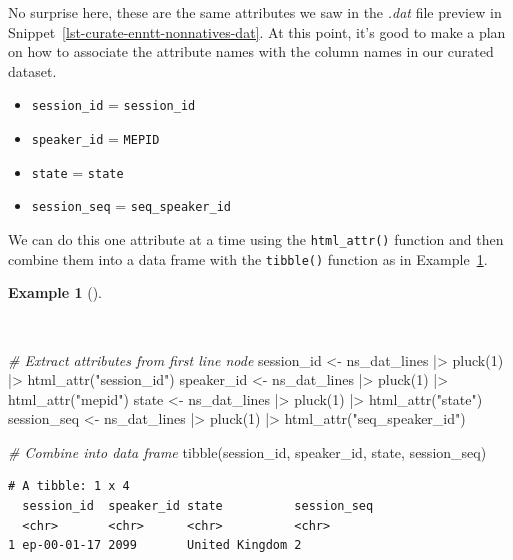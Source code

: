 \documentclass[
  letterpaper,
]{book}
\newenvironment{Shaded}{\begin{snugshade}}{\end{snugshade}}
\newcommand{\CommentTok}[1]{\textcolor[rgb]{0.00,0.00,0.00}{\textit{#1}}}
\newcommand{\DecValTok}[1]{\textcolor[rgb]{0.00,0.00,0.00}{#1}}
\newcommand{\FunctionTok}[1]{\textcolor[rgb]{0.00,0.00,0.00}{#1}}
\newcommand{\NormalTok}[1]{\textcolor[rgb]{0.00,0.00,0.00}{#1}}
\newcommand{\OtherTok}[1]{\textcolor[rgb]{0.00,0.00,0.00}{#1}}
\newcommand{\SpecialCharTok}[1]{\textcolor[rgb]{0.00,0.00,0.00}{#1}}
\newcommand{\StringTok}[1]{\textcolor[rgb]{0.00,0.00,0.00}{#1}}
\providecommand{\tightlist}{%
  \setlength{\itemsep}{0pt}\setlength{\parskip}{0pt}}\usepackage{longtable,booktabs,array}
\theoremstyle{definition}
\newtheorem{example}{Example}[chapter]
\theoremstyle{remark}
\begin{document}
No surprise here, these are the same attributes we saw in the
\emph{.dat} file preview in
Snippet~\ref{lst-curate-enntt-nonnatives-dat}. At this point, it's good
to make a plan on how to associate the attribute names with the column
names in our curated dataset.

\begin{itemize}
\tightlist
\item
  \texttt{session\_id} = \texttt{session\_id}
\item
  \texttt{speaker\_id} = \texttt{MEPID}
\item
  \texttt{state} = \texttt{state}
\item
  \texttt{session\_seq} = \texttt{seq\_speaker\_id}
\end{itemize}

We can do this one attribute at a time using the \texttt{html\_attr()}
function and then combine them into a data frame with the
\texttt{tibble()} function as in
Example~\ref{exm-curate-enntt-extract-attributes}.

\begin{example}[]\protect\hypertarget{exm-curate-enntt-extract-attributes}{}\label{exm-curate-enntt-extract-attributes}

~

\begin{Shaded}
\begin{Highlighting}[]
\CommentTok{\# Extract attributes from first line node}
\NormalTok{session\_id }\OtherTok{\textless{}{-}}\NormalTok{ ns\_dat\_lines }\SpecialCharTok{|\textgreater{}} \FunctionTok{pluck}\NormalTok{(}\DecValTok{1}\NormalTok{) }\SpecialCharTok{|\textgreater{}} \FunctionTok{html\_attr}\NormalTok{(}\StringTok{"session\_id"}\NormalTok{)}
\NormalTok{speaker\_id }\OtherTok{\textless{}{-}}\NormalTok{ ns\_dat\_lines }\SpecialCharTok{|\textgreater{}} \FunctionTok{pluck}\NormalTok{(}\DecValTok{1}\NormalTok{) }\SpecialCharTok{|\textgreater{}} \FunctionTok{html\_attr}\NormalTok{(}\StringTok{"mepid"}\NormalTok{)}
\NormalTok{state }\OtherTok{\textless{}{-}}\NormalTok{ ns\_dat\_lines }\SpecialCharTok{|\textgreater{}} \FunctionTok{pluck}\NormalTok{(}\DecValTok{1}\NormalTok{) }\SpecialCharTok{|\textgreater{}} \FunctionTok{html\_attr}\NormalTok{(}\StringTok{"state"}\NormalTok{)}
\NormalTok{session\_seq }\OtherTok{\textless{}{-}}\NormalTok{ ns\_dat\_lines }\SpecialCharTok{|\textgreater{}} \FunctionTok{pluck}\NormalTok{(}\DecValTok{1}\NormalTok{) }\SpecialCharTok{|\textgreater{}} \FunctionTok{html\_attr}\NormalTok{(}\StringTok{"seq\_speaker\_id"}\NormalTok{)}

\CommentTok{\# Combine into data frame}
\FunctionTok{tibble}\NormalTok{(session\_id, speaker\_id, state, session\_seq)}
\end{Highlighting}
\end{Shaded}

\begin{verbatim}
# A tibble: 1 x 4
  session_id  speaker_id state          session_seq
  <chr>       <chr>      <chr>          <chr>      
1 ep-00-01-17 2099       United Kingdom 2          
\end{verbatim}

\end{example}
\end{document}
